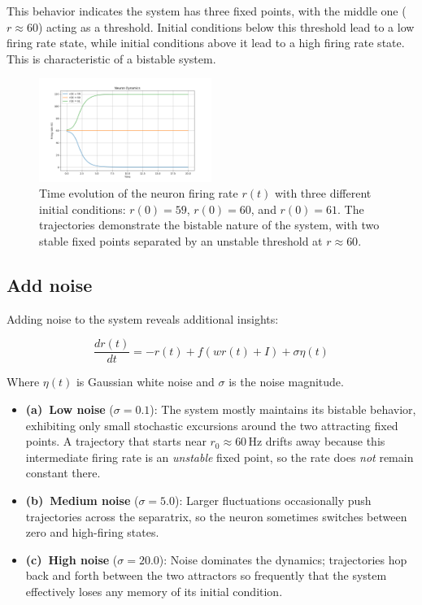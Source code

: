 \documentclass{article}
\begin{document}
This behavior indicates the system has three fixed points, with the middle one ($r \approx 60$) acting as a threshold. Initial conditions below this threshold lead to a low firing rate state, while initial conditions above it lead to a high firing rate state. This is characteristic of a bistable system.

\begin{figure}[H]
    \centering
    \includegraphics[width=0.5\textwidth]{deterministic_dynamics.png}
    \caption{Time evolution of the neuron firing rate $r(t)$ with three different initial conditions: $r(0) = 59$, $r(0) = 60$, and $r(0) = 61$. The trajectories demonstrate the bistable nature of the system, with two stable fixed points separated by an unstable threshold at $r \approx 60$.}
    \label{fig:deterministic}
\end{figure}

\subsection{Add noise}

Adding noise to the system reveals additional insights:

\begin{equation}
\frac{dr(t)}{dt} = -r(t) + f(wr(t) + I) + \sigma\eta(t)
\end{equation}

Where $\eta(t)$ is Gaussian white noise and $\sigma$ is the noise magnitude.

\begin{itemize}
    \item \textbf{(a)~Low noise} ($\sigma = 0.1$): The system mostly maintains its bistable behavior, exhibiting only small stochastic excursions around the two attracting fixed points.  A trajectory that starts near $r_0 \!\approx\! 60\,$Hz drifts away because this intermediate firing rate is an \emph{unstable} fixed point, so the rate does \emph{not} remain constant there. 
    \item \textbf{(b)~Medium noise} ($\sigma = 5.0$): Larger fluctuations occasionally push trajectories across the separatrix, so the neuron sometimes switches between zero and high-firing states.
    \item \textbf{(c)~High noise} ($\sigma = 20.0$): Noise dominates the dynamics; trajectories hop back and forth between the two attractors so frequently that the system effectively loses any memory of its initial condition.
\end{itemize}
\end{document}
